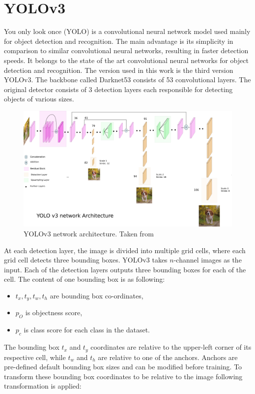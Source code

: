 \documentclass[twoside]{ctuthesis}
\theoremstyle{plain}
\theoremstyle{definition}
\theoremstyle{note}
\begin{document}
\section{YOLOv3}
You only look once (YOLO) is a convolutional neural network model used mainly for object detection and recognition\cite{redmon2016look}. The main advantage is its simplicity in comparison to similar convolutional neural networks, resulting in faster detection speeds. It belongs to the state of the art convolutional neural networks for object detection and recognition. The version used in this work is the third version YOLOv3\cite{redmon2018yolov3}. The backbone called Darknet53 consists of 53 convolutional layers. The original detector consists of 3 detection layers each responsible for detecting objects of various sizes. 
\begin{figure}[h]
	\caption{YOLOv3 network architecture. Taken from \cite{kathuria_2018}}
	\centering
	\includegraphics[width=\textwidth]{yolov3_model.png}
\end{figure}
At each detection layer, the image is divided into multiple grid cells, where each grid cell detects three bounding boxes. YOLOv3 takes $n$-channel images as the input. Each of the detection layers outputs three bounding boxes for each of the cell. The content of one bounding box is as following:
\begin{itemize}
	\item $t_x, t_y, t_w, t_h$ are bounding box co-ordinates,
	\item $p_O$ is objectness score,
	\item $p_c$ is class score for each class in the dataset.
\end{itemize}
The bounding box $t_x$ and $t_y$ coordinates are relative to the upper-left corner of its respective cell, while $t_w$ and $t_h$ are relative to one of the anchors. Anchors are pre-defined default bounding box sizes and can be modified before training. To transform these bounding box coordinates to be relative to the image following transformation is applied:
\end{document}
